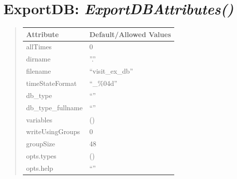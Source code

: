 \documentclass[letterpaper,10pt,english]{sphinxmanual}
\begin{document}
\begin{DUlineblock}{0em}
\item[] 
\end{DUlineblock}

\begin{DUlineblock}{0em}
\item[] 
\end{DUlineblock}


\section{\textbf{ExportDB}: \emph{ExportDBAttributes()}}
\label{attributes:exportdb-exportdbattributes}
\begin{DUlineblock}{0em}
\item[] 
\end{DUlineblock}
\begin{quote}

\begin{tabulary}{\linewidth}{|L|L|}
\hline

\textbf{Attribute}
 & 
\textbf{Default/Allowed Values}
\\
\hline
allTimes
 & 
0
\\
\hline
dirname
 & 
''.''
\\
\hline
filename
 & 
``visit\_ex\_db''
\\
\hline
timeStateFormat
 & 
``\_\%04d''
\\
\hline
db\_type
 & 
``''
\\
\hline
db\_type\_fullname
 & 
``''
\\
\hline
variables
 & 
()
\\
\hline
writeUsingGroups
 & 
0
\\
\hline
groupSize
 & 
48
\\
\hline
opts.types
 & 
()
\\
\hline
opts.help
 & 
``''
\\
\hline\end{tabulary}

\end{quote}

\begin{DUlineblock}{0em}
\item[] 
\end{DUlineblock}

\begin{DUlineblock}{0em}
\item[] 
\end{DUlineblock}
\end{document}

